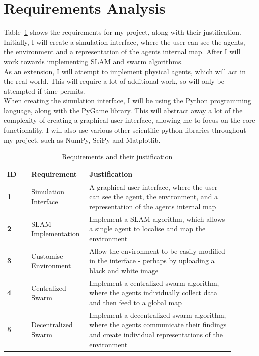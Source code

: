 \documentclass[12pt]{article}
\begin{document}
\section{Requirements Analysis}
Table~\ref{tab:requirements_table} shows the requirements for my project, along with their justification. Initially, I will
create a simulation interface, where the user can see the agents, the environment and a representation of the agents internal
map. After I will work towards implementing SLAM and swarm algorithms.\\
As an extension, I will attempt to implement physical agents, which will act in the real world. This will require a lot of
additional work, so will only be attempted if time permits.\\
When creating the simulation interface, I will be using the Python programming language, along with the PyGame library. This
will abstract away a lot of the complexity of creating a graphical user interface, allowing me to focus on the core functionality.
I will also use various other scientific python libraries throughout my project, such as NumPy, SciPy and Matplotlib.\\

\begin{table}[H]
    \centering
    \begin{tabular}{|p{0.1\linewidth}|p{0.2\linewidth}|p{0.6\linewidth}|}
        \hline
        \textbf{ID} &
        \textbf{Requirement} &
        \textbf{Justification}\\
        \hline
        \textbf{1} &
        Simulation Interface &
        A graphical user interface, where the user can see the agent, the environment, and a representation of
            the agents internal map\\
        \hline
        \textbf{2} &
        SLAM Implementation &
        Implement a SLAM algorithm, which allows a single agent to localise and map the environment\\
        \hline
        \textbf{3} &
        Customise Environment &
        Allow the environment to be easily modified in the interface - perhaps by uploading a black and white image\\
        \hline
        \textbf{4} &
        Centralized Swarm &
        Implement a centralized swarm algorithm, where the agents individually collect data and then feed to a global map\\
        \hline
        \textbf{5} &
        Decentralized Swarm &
        Implement a decentralized swarm algorithm, where the agents communicate their findings and create individual representations
            of the environment\\
        \hline
    \end{tabular}
    \caption{Requirements and their justification}\label{tab:requirements_table}
\end{table}
\end{document}
